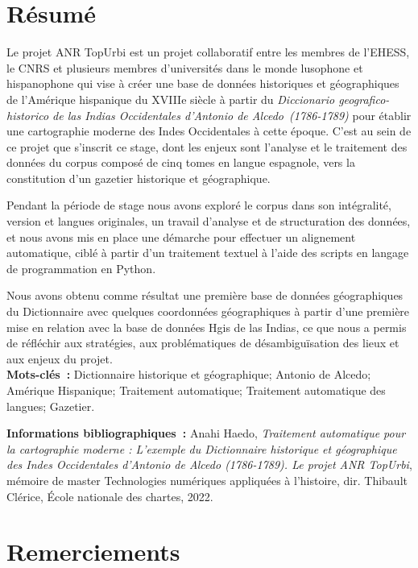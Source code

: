 \documentclass[a4paper,12pt,twoside]{book}
\begin{document}
	\frontmatter
	\chapter{Résumé}
	\medskip
	Le projet ANR TopUrbi est un projet collaboratif entre les membres de l’\Gls{EHESS}, le CNRS et plusieurs membres d’universités dans le monde lusophone et hispanophone qui vise à créer une base de données historiques et géographiques de l’Amérique hispanique du XVIIIe siècle à partir du \textit{Diccionario geografico-historico de las Indias Occidentales d’Antonio de Alcedo (1786-1789)} pour établir une cartographie moderne des Indes Occidentales à cette époque. C’est au sein de ce projet que s’inscrit ce stage, dont les enjeux sont l’analyse et le traitement des données du corpus composé de cinq tomes en langue espagnole, vers la constitution d’un gazetier historique et géographique.

	Pendant la période de stage nous avons exploré le corpus dans son intégralité, version et langues originales, un travail d’analyse et de structuration des données, et nous avons mis en place une démarche pour effectuer un alignement automatique, ciblé à partir d’un traitement textuel à l’aide des scripts en langage de programmation en  Python.

	Nous avons obtenu comme résultat une première base de données géographiques du Dictionnaire avec quelques coordonnées géographiques à partir d’une première mise en relation avec la base de données Hgis de las Indias, ce que nous a permis de réfléchir aux stratégies, aux problématiques de désambiguïsation des lieux et aux enjeux du projet.\\
	
	\textbf{Mots-clés~:} Dictionnaire historique et géographique; Antonio de Alcedo; Amérique Hispanique; Traitement automatique; Traitement automatique des langues; Gazetier.
	
	\textbf{Informations bibliographiques~:} Anahi Haedo, \textit{Traitement automatique pour la cartographie moderne : L’exemple du Dictionnaire historique et géographique des Indes Occidentales d’Antonio de Alcedo (1786-1789). Le projet ANR TopUrbi}, mémoire de master \og{}Technologies numériques appliquées à l'histoire\fg{}, dir. Thibault Clérice, École nationale des chartes, 2022.
	
	\chapter{Remerciements}
	
\end{document}
